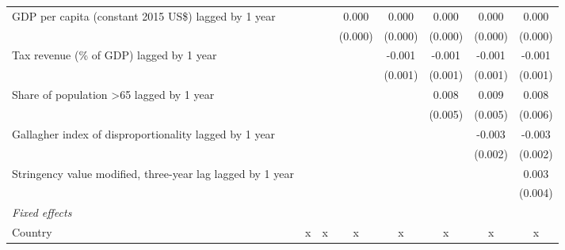 \begin{tabular}{lccccccc}
   GDP per capita (constant 2015 US\$) lagged by 1 year                                &              &               & 0.000        & 0.000         & 0.000         & 0.000         & 0.000\\   
                                                                                       &              &               & (0.000)      & (0.000)       & (0.000)       & (0.000)       & (0.000)\\   
   Tax revenue (\% of GDP) lagged by 1 year                                            &              &               &              & -0.001        & -0.001        & -0.001        & -0.001\\   
                                                                                       &              &               &              & (0.001)       & (0.001)       & (0.001)       & (0.001)\\   
   Share of population >65 lagged by 1 year                                            &              &               &              &               & 0.008         & 0.009         & 0.008\\   
                                                                                       &              &               &              &               & (0.005)       & (0.005)       & (0.006)\\   
   Gallagher index of disproportionality lagged by 1 year                              &              &               &              &               &               & -0.003        & -0.003\\   
                                                                                       &              &               &              &               &               & (0.002)       & (0.002)\\   
   Stringency value modified, three-year lag lagged by 1 year                          &              &               &              &               &               &               & 0.003\\   
                                                                                       &              &               &              &               &               &               & (0.004)\\   
   \emph{Fixed effects}\\
   Country                                                                             & x            & x             & x            & x             & x             & x             & x\\  

\end{tabular}
